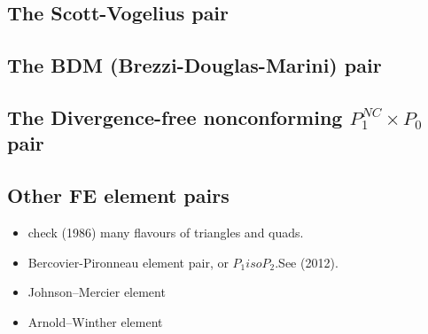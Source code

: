 \newpage
\subsection{The Scott-Vogelius pair} \label{ss:scott_vogelius}


\subsection{The BDM (Brezzi-Douglas-Marini) pair} \label{ss:bdm}


\subsection{The Divergence-free nonconforming ${ P}_1^{NC}\times P_0$ pair} \label{ss:p1ncp0}



\subsection{Other FE element pairs}

\begin{itemize}

\item check \textcite{dhhu86} (1986) many flavours of triangles and quads.

\item Bercovier-Pironneau element pair, or $P_1isoP_2$.See \textcite{bocg12} (2012).

\item Johnson–Mercier element \cite{aubb17}

\item Arnold–Winther element \cite{aubb17}

\end{itemize}


